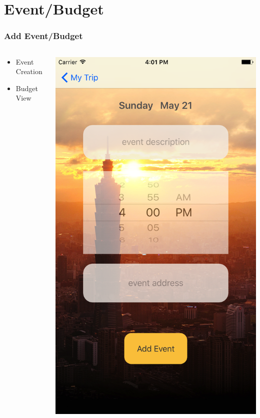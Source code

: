 \documentclass{beamer}
\begin{document}
\section{Event/Budget}
\begin{frame}
\frametitle{Add Event/Budget}
\begin{columns}
    \begin{column}{0.3\textwidth}
        \begin{itemize}
            \item Event Creation
            \item Budget View
        \end{itemize}
    \end{column}
    \begin{column}{0.3\textwidth}  %
        \begin{center}
            \includegraphics[scale=0.08]{eventCreation}

\end{center}
\end{column}
\end{columns}
\end{frame}
\end{document}
